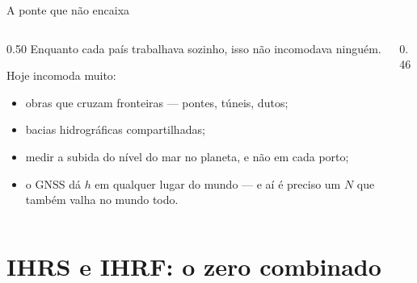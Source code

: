 \documentclass[aspectratio=169,11pt]{beamer}
\begin{document}
\begin{frame}{A ponte que não encaixa}
  \begin{columns}[c]
    \begin{column}{0.50\textwidth}
      Enquanto cada país trabalhava sozinho, isso não incomodava ninguém.
      \medskip

      Hoje incomoda muito:
      \begin{itemize}
        \item obras que cruzam fronteiras --- pontes, túneis, dutos;
        \item bacias hidrográficas compartilhadas;
        \item medir a subida do nível do mar \alert{no planeta}, e não em cada porto;
        \item o GNSS dá $h$ em qualquer lugar do mundo --- e aí é preciso um $N$ que
              também valha no mundo todo.
      \end{itemize}
    \end{column}
    \begin{column}{0.46\textwidth}
      \centering
    \end{column}
  \end{columns}
\end{frame}

\section{IHRS e IHRF: o zero combinado}
\end{document}
